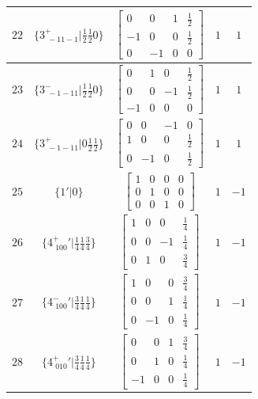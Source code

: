 \documentclass[fleqn,8pt]{jsarticle}
\begin{document}
\begin{longtable}{ccccc}
$ 22 $ & $ \{3^{+}_{\,\,-11-1}|\frac{1}{2} \frac{1}{2} 0\} $ & $ \begin{bmatrix} 0 & 0 & 1 & \frac{1}{2} \\ -1 & 0 & 0 & \frac{1}{2} \\ 0 & -1 & 0 & 0 \end{bmatrix} $ & $ 1 $ & $ 1 $ \\ \hline
$ 23 $ & $ \{3^{-}_{\,\,-1-11}|\frac{1}{2} \frac{1}{2} 0\} $ & $ \begin{bmatrix} 0 & 1 & 0 & \frac{1}{2} \\ 0 & 0 & -1 & \frac{1}{2} \\ -1 & 0 & 0 & 0 \end{bmatrix} $ & $ 1 $ & $ 1 $ \\ \hline
$ 24 $ & $ \{3^{+}_{\,\,-1-11}|0 \frac{1}{2} \frac{1}{2}\} $ & $ \begin{bmatrix} 0 & 0 & -1 & 0 \\ 1 & 0 & 0 & \frac{1}{2} \\ 0 & -1 & 0 & \frac{1}{2} \end{bmatrix} $ & $ 1 $ & $ 1 $ \\ \hline
$ 25 $ & $ \{1{}'|0\} $ & $ \begin{bmatrix} 1 & 0 & 0 & 0 \\ 0 & 1 & 0 & 0 \\ 0 & 0 & 1 & 0 \end{bmatrix} $ & $ 1 $ & $ -1 $ \\ \hline
$ 26 $ & $ \{4^{+}_{\,\,100}{}'|\frac{1}{4} \frac{1}{4} \frac{3}{4}\} $ & $ \begin{bmatrix} 1 & 0 & 0 & \frac{1}{4} \\ 0 & 0 & -1 & \frac{1}{4} \\ 0 & 1 & 0 & \frac{3}{4} \end{bmatrix} $ & $ 1 $ & $ -1 $ \\ \hline
$ 27 $ & $ \{4^{-}_{\,\,100}{}'|\frac{3}{4} \frac{1}{4} \frac{1}{4}\} $ & $ \begin{bmatrix} 1 & 0 & 0 & \frac{3}{4} \\ 0 & 0 & 1 & \frac{1}{4} \\ 0 & -1 & 0 & \frac{1}{4} \end{bmatrix} $ & $ 1 $ & $ -1 $ \\ \hline
$ 28 $ & $ \{4^{+}_{\,\,010}{}'|\frac{3}{4} \frac{1}{4} \frac{1}{4}\} $ & $ \begin{bmatrix} 0 & 0 & 1 & \frac{3}{4} \\ 0 & 1 & 0 & \frac{1}{4} \\ -1 & 0 & 0 & \frac{1}{4} \end{bmatrix} $ & $ 1 $ & $ -1 $ \\ \hline

\end{longtable}
\end{document}
